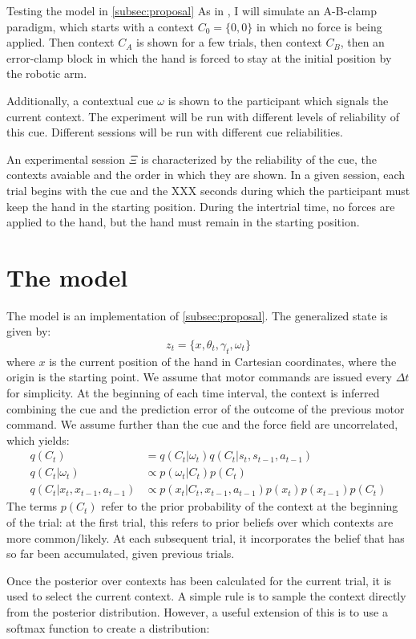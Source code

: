\documentclass{report}
\begin{document}
\begin{chapter}{Testing the model in \ref{subsec:proposal}}
As in \cite{Lee_Dual_2009}, I will simulate an A-B-clamp paradigm, which starts with a context $C_0 = \{0, 0\}$ in which no force is being applied. Then context $C_A$ is shown for a few trials, then context $C_B$, then an error-clamp block in which the hand is forced to stay at the initial position by the robotic arm.

Additionally, a contextual cue $\omega$ is shown to the participant which signals the current context. The experiment will be run with different levels of reliability of this cue. Different sessions will be run with different cue reliabilities.

An experimental session $\Xi$ is characterized by the reliability of the cue, the contexts avaiable and the order in which they are shown. In a given session, each trial begins with the cue and the XXX seconds during which the participant must keep the hand in the starting position. During the intertrial time, no forces are applied to the hand, but the hand must remain in the starting position.

\section{The model}
The model is an implementation of \ref{subsec:proposal}. The generalized state is given by:
\[
z_t = \{x, \theta_t, \gamma_t, \omega_t\}
\]
where $x$ is the current position of the hand in Cartesian coordinates, where the origin is the starting point. We assume that motor commands are issued every $\Delta t$ for simplicity. At the beginning of each time interval, the context is inferred combining the cue and the prediction error of the outcome of the previous motor command. We assume further than the cue and the force field are uncorrelated, which yields:
\begin{align}
  q(C_t) &= q(C_t | \omega_t)q(C_t | s_t, s_{t-1}, a_{t-1}) \\ \label{eqn:estimated-context}
  q(C_t | \omega_t) &\propto p(\omega_t | C_t)p(C_t) \\
  q(C_t | x_t, x_{t-1}, a_{t-1}) &\propto p(x_t | C_t, x_{t-1}, a_{t-1})p(x_t)p(x_{t-1})p(C_t)
\end{align}
The terms $p(C_t)$ refer to the prior probability of the context at the beginning of the trial: at the first trial, this refers to prior beliefs over which contexts are more common/likely. At each subsequent trial, it incorporates the belief that has so far been accumulated, given previous trials.

Once the posterior over contexts has been calculated for the current trial, it is used to select the current context. A simple rule is to sample the context directly from the posterior distribution. However, a useful extension of this is to use a softmax function to create a distribution:


\end{chapter}
\end{document}
